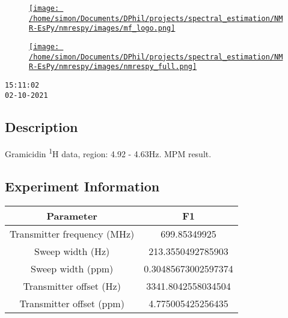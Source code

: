 \documentclass[8pt]{article}
\begin{document}
\begin{figure}[!ht]
\begin{minipage}[b][2.5cm][c]{.72\textwidth}
\href{http://foroozandeh.chem.ox.ac.uk/home}%
{\texttt{[image: /home/simon/Documents/DPhil/projects/spectral\_estimation/NMR-EsPy/nmrespy/images/mf\_logo.png]}}
\end{minipage}
\begin{minipage}[b][2.5cm][c]{.27\textwidth}
\href{https://foroozandehgroup.github.io/NMR-EsPy}%
{\texttt{[image: /home/simon/Documents/DPhil/projects/spectral\_estimation/NMR-EsPy/nmrespy/images/nmrespy\_full.png]}}
\end{minipage}
\end{figure}

\texttt{15:11:02\\02-10-2021}

\subsection*{Description}
Gramicidin \textsuperscript{1}H data, region: 4.92 - 4.63Hz. MPM result.

\subsection*{Experiment Information}
\hspace{-6pt}
\begin{longtable}[l]{c c}
\toprule
Parameter & F1
\\\midrule
Transmitter frequency (MHz) & 699.85349925\\
Sweep width (Hz) & 213.3550492785903\\
Sweep width (ppm) & 0.30485673002597374\\
Transmitter offset (Hz) & 3341.8042558034504\\
Transmitter offset (ppm) & 4.775005425256435\\
\bottomrule
\end{longtable}

\end{document}
